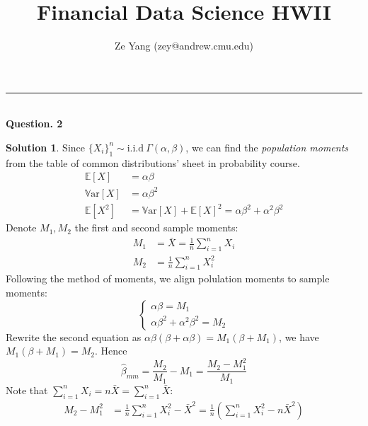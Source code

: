\documentclass[a4paper, 10pt]{article}
\title{\textbf{Financial Data Science HWII}}
\author{Ze Yang (zey@andrew.cmu.edu)}
\theoremstyle{definition}
\theoremstyle{hSol}
\newtheorem*{solution}{Solution}
\begin{document}
\maketitle


\noindent\rule{16cm}{0.4pt}
~\\
\textbf{Question. 2}
\begin{solution} Since $\{X_i\}_1^n\sim\text{i.i.d}~\Gamma(\alpha, \beta)$, we can find the \textit{population moments} from the table of common distributions' sheet in probability course. 
\begin{equation}
\begin{split}
    \mathbb{E}\left[X\right] &= \alpha \beta\\
    \mathrm{\mathbb{V}ar}\left[X\right] &= \alpha \beta^2 \\
    \mathbb{E}\left[X^2\right]&= \mathrm{\mathbb{V}ar}\left[X\right] + \mathbb{E}\left[X\right]^2 = \alpha\beta^2 + \alpha^2\beta^2
\end{split}
\end{equation}
Denote $M_1, M_2$ the first and second sample moments:
\begin{equation}
  \begin{split}
    M_1 &= \bar{X} = \frac{1}{n}\sum_{i=1}^n X_i\\
    M_2 &= \frac{1}{n}\sum_{i=1}^n X_i^2
  \end{split}
\end{equation}
Following the method of moments, we align polulation moments to sample moments:
\begin{equation}
  \begin{cases}
  \alpha \beta = M_1 \\
   \alpha\beta^2 + \alpha^2\beta^2 = M_2
  \end{cases}
\end{equation}
Rewrite the second equation as $\alpha\beta(\beta + \alpha\beta) = M_1(\beta + M_1)$, we have $M_1(\beta + M_1) = M_2$. Hence
\begin{equation}
  \hat{\beta}_{mm} = \frac{M_2}{M_1} - M_1 = \frac{M_2- M_1^2}{M_1}
\end{equation}
Note that $\sum_{i=1}^n X_i = n\bar{X} = \sum_{i=1}^n \bar{X}$:
\begin{equation}
  \begin{split}
    M_2 - M_1^2 &= \frac{1}{n}\sum_{i=1}^n X_i^2 - \bar{X}^2 = \frac{1}{n}\left(\sum_{i=1}^n X_i^2 - n\bar{X}^2\right) \\

\end{split}
\end{equation}
\end{solution}
\end{document}
